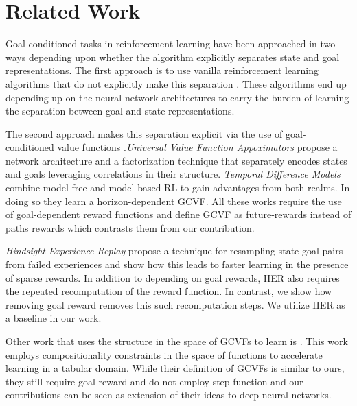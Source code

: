 \section{Related Work}

Goal-conditioned tasks in reinforcement learning have been approached in two
ways depending upon whether the algorithm explicitly separates state and goal
representations.
The first approach is to use vanilla reinforcement
learning algorithms that do not explicitly make this separation
\citep{mirowski2016learning,dosovitskiy2016learning,gupta2017cognitive,parisotto2017neural,mirowski2018learning}.
These algorithms end up depending up on the neural network architectures to
carry the burden of learning the separation between goal and state representations.

The second approach makes this separation explicit via the use of goal-conditioned value
functions \citep{foster2002structure,sutton2011horde}.\emph{Universal
Value Function Appoximators} \citep{schaul2015universal} propose a
network architecture and a factorization technique that separately
encodes states and goals leveraging correlations in their structure.
\emph{Temporal Difference Models} combine model-free
and model-based RL to gain advantages from both realms. In doing so they
learn a horizon-dependent GCVF. All these works require the use of
goal-dependent reward functions and define GCVF as future-rewards instead of
paths rewards which contrasts them from our contribution. 

\emph{Hindsight Experience Replay} \cite{andrychowicz2017hindsight}
propose a technique for resampling state-goal pairs from failed
experiences and show how this leads to faster learning in the presence
of sparse rewards. In addition to depending on goal rewards, HER also
requires the repeated recomputation of the reward function. In contrast,
we show how removing goal reward removes this such recomputation steps.
We utilize HER as a baseline in our work. 

Other work that uses the structure in the space of GCVFs to learn is
\citet{dhiman2018floydwarshall}. This work employs compositionality constraints
in the space of functions to accelerate learning in a tabular domain. While
their definition of GCVFs is similar to ours, they still require goal-reward and
do not employ step function and our contributions can be seen as extension of
their ideas to deep neural networks.


